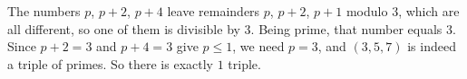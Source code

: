 The numbers $p$, $p+2$, $p+4$ leave remainders $p$, $p+2$, $p+1$ modulo $3$, which are all different, so one of them is divisible by $3$. Being prime, that number equals $3$. Since $p+2=3$ and $p+4=3$ give $p\le1$, we need $p=3$, and $(3,5,7)$ is indeed a triple of primes. So there is exactly $\boxed{1}$ triple.
